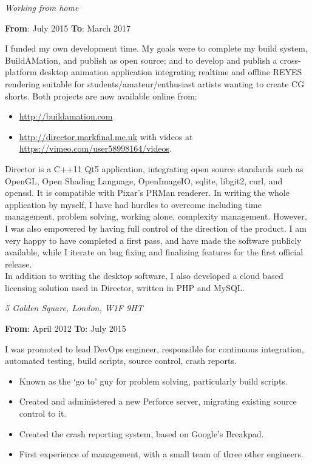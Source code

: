 \documentclass[a4paper,12pt]{article}
\newcommand{\place}[2]{\vspace*{1ex}{\noindent\bf #1}\hfill{\it #2}\par}
\newcommand{\fromto}[2]{{\bf From}: #1 {\bf To}: #2\par}
\begin{document}
\place{Entrepreneur}{Working from home}
\fromto{July 2015}{March 2017}
I funded my own development time. My goals were to complete my build system, BuildAMation, and publish as open source; and to develop and publish a cross-platform desktop animation application integrating realtime and offline REYES rendering suitable for students/amateur/enthusiast artists wanting to create CG shorts. Both projects are now available online from:
\begin{itemize}
\item \href{http://buildamation.com}{http://buildamation.com}
\item \href{http://director.markfinal.me.uk}{http://director.markfinal.me.uk} with videos at \href{https://vimeo.com/user58998164/videos}{https://vimeo.com/user58998164/videos}.
\end{itemize}
Director is a C++11 Qt5 application, integrating open source standards such as OpenGL, Open Shading Language, OpenImageIO, sqlite, libgit2, curl, and openssl. It is compatible with Pixar's PRMan renderer. In writing the whole application by myself, I have had hurdles to overcome including time management, problem solving, working alone, complexity management. However, I was also empowered by having full control of the direction of the product. I am very happy to have completed a first pass, and have made the software publicly available, while I iterate on bug fixing and finalizing features for the first official release.
\\
In addition to writing the desktop software, I also developed a cloud based licensing solution used in Director, written in PHP and MySQL.

\place{The Foundry VisionMongers Ltd}{5 Golden Square, London, W1F 9HT}
\fromto{April 2012}{July 2015}
I was promoted to lead DevOps engineer, responsible for continuous integration, automated testing, build scripts, source control, crash reports.
\begin{itemize}
\item Known as the `go to' guy for problem solving, particularly build scripts.
\item Created and administered a new Perforce server, migrating existing source control to it.
\item Created the crash reporting system, based on Google's Breakpad.
\item First experience of management, with a small team of three other engineers.
\end{itemize}
\end{document}
